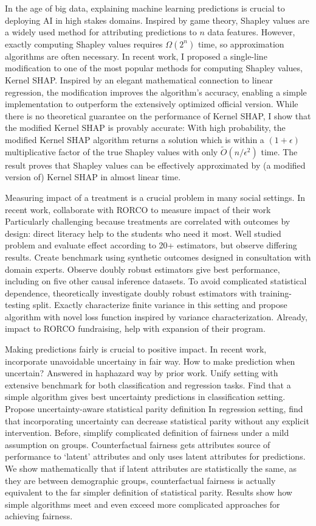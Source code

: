 \documentclass[11pt]{article}
\begin{document}
In the age of big data, explaining machine learning predictions is crucial to deploying AI in high stakes domains.
Inspired by game theory, Shapley values are a widely used method for attributing predictions to $n$ data features.
However, exactly computing Shapley values requires $\Omega(2^n)$ time, so approximation algorithms are often necessary.
In recent work, I proposed a single-line modification to one of the most popular methods for computing Shapley values, Kernel SHAP.
Inspired by an elegant mathematical connection to linear regression, the modification improves the algorithm's accuracy, enabling a simple implementation to outperform the extensively optimized official version.
While there is no theoretical guarantee on the performance of Kernel SHAP, I show that the modified Kernel SHAP is provably accurate:
With high probability, the modified Kernel SHAP algorithm returns a solution which is within a $(1+\epsilon)$ multiplicative factor of the true Shapley values with only $\tilde{O}(n/\epsilon^2)$ time.
The result proves that Shapley values can be effectively approximated by (a modified version of) Kernel SHAP in almost linear time.

Measuring impact of a treatment is a crucial problem in many social settings.
In recent work, collaborate with RORCO to measure impact of their work
Particularly challenging because treatments are correlated with outcomes by design: direct literacy help to the students who need it most.
Well studied problem and evaluate effect according to 20+ estimators, but observe differing results.
Create benchmark using synthetic outcomes designed in consultation with domain experts.
Observe doubly robust estimators give best performance, including on five other causal inference datasets.
To avoid complicated statistical dependence,
theoretically investigate doubly robust estimators with training-testing split.
Exactly characterize finite variance in this setting and propose algorithm with novel loss function inspired by variance characterization.
Already, impact to RORCO fundraising, help with expansion of their program.

Making predictions fairly is crucial to positive impact.
In recent work, incorporate unavoidable uncertainy in fair way.
How to make prediction when uncertain?
Answered in haphazard way by prior work.
Unify setting with extensive benchmark for both classification and regression tasks.
Find that a simple algorithm gives best uncertainty predictions in classification setting.
Propose uncertainty-aware statistical parity definition
In regression setting, find that incorporating uncertainty can decrease statistical parity without any explicit intervention.
Before, simplify complicated definition of fairness under a mild assumption on groups.
Counterfactual fairness gets attributes source of performance to `latent' attributes and only uses latent attributes for predictions.
We show mathematically that if latent attributes are statistically the same, as they are between demographic groups, counterfactual fairness is actually equivalent to the far simpler definition of statistical parity.
Results show how simple algorithms meet and even exceed more complicated approaches for achieving fairness.
\end{document}
